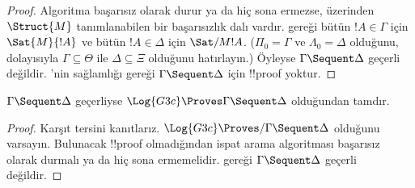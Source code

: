 \documentclass[../../../include/open-logic-section]{subfiles}
\begin{document}
\begin{proof}
  Algoritma başarısız olarak durur ya da hiç sona ermezse, üzerinden
  $\Struct{M}$ tanımlanabilen bir başarısızlık dalı vardır. 
  gereği bütün $!A \in \Gamma$ için $\Sat{M}{!A}$ ve bütün $!A \in \Delta$
  için $\Sat/{M}{!A}$. ($\Pi_0 = \Gamma$ ve $\Lambda_0 = \Delta$ olduğunu,
  dolayısıyla $\Gamma \subseteq \Theta$ ile $\Delta \subseteq \Xi$ olduğunu
  hatırlayın.) Öyleyse $\Gamma \Sequent \Delta$ geçerli değildir.
  'nin sağlamlığı gereği $\Gamma \Sequent \Delta$ için !!{proof}
  yoktur.
\end{proof}

\begin{cor}
$\Gamma \Sequent \Delta$ geçerliyse $\Log{G3c} \Proves \Gamma \Sequent
\Delta$ olduğundan  tamdır.
\end{cor}

\begin{proof}
  Karşıt tersini kanıtlarız. $\Log{G3c} \Proves/ \Gamma \Sequent \Delta$
  olduğunu varsayın. Bulunacak !!{proof} olmadığından ispat arama algoritması
  başarısız olarak durmalı ya da hiç sona ermemelidir. 
  gereği $\Gamma \Sequent \Delta$ geçerli değildir.
\end{proof}
\end{document}
